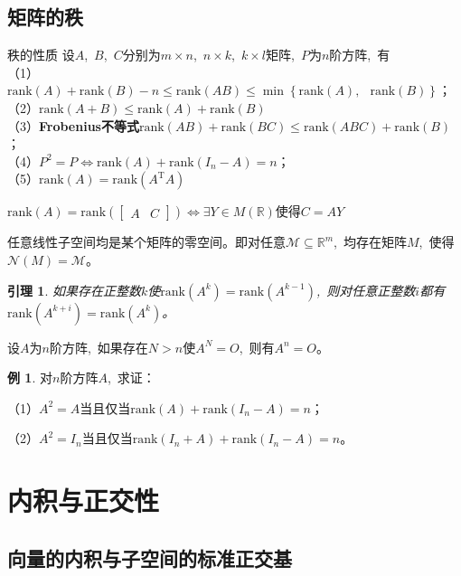 \documentclass[10pt, a4paper, oneside, fontset=none]{ctexart}
\theoremstyle{plain}
\newtheorem{lemma}[theorem]{引理}
\theoremstyle{definition}
\newtheorem{example}[theorem]{例}
\newcommand{\com}{,\,\,\,\:}
\newcommand{\di}[2][]{\begin{theo}{#1}\run #2\end{theo}}
\newcommand{\R}{\mathbb{R}}
\newcommand{\tbome}[1]{\textbf{\run\color{meihong!75!black}#1}}
\begin{document}
\subsection{矩阵的秩}
\di[秩的性质]{
    设$A$\com $B$\com $C$分别为$m\times n$\com $n\times k$\com $k\times l$矩阵\com $P$为$n$阶方阵\com 有\\
    （1）$\mathrm{rank}(A)+\mathrm{rank}(B)-n \le \mathrm{rank}(AB) \le \min\left\{\mathrm{rank}(A)\com \mathrm{rank}(B)\right\}$；\\
    （2）$\mathrm{rank}(A+B)\le \mathrm{rank}(A)+\mathrm{rank}(B)$\\
    （3）\tbome{\textup{Frobenius}不等式}\quad$\mathrm{rank}(AB)+\mathrm{rank}(BC) \le \mathrm{rank}(ABC)+\mathrm{rank}(B)$；\\
    （4）$P^2=P \Leftrightarrow \mathrm{rank}(A)+\mathrm{rank}(I_n-A)=n$；\\
    （5）$\mathrm{rank}(A)=\mathrm{rank}(A^\mathrm{T}A)$
}
\di[]{
    $\mathrm{rank}(A)=\mathrm{rank}\left(\begin{bmatrix}
        A & C
    \end{bmatrix}\right) \Leftrightarrow \exists Y\in M(\R) $使得$ C=AY$
}
\di[]{
    任意线性子空间均是某个矩阵的零空间。即对任意$\mathcal{M}\subseteq\R^m$\com 均存在矩阵$M$\com 使得$\mathcal{N}(M)=\mathcal{M}$。
}
\begin{lemma}
    如果存在正整数$k$使$\mathrm{rank}(A^k)=\mathrm{rank}(A^{k-1})$\com 则对任意正整数$i$都有$\mathrm{rank}(A^{k+i})=\mathrm{rank}(A^k)$。
\end{lemma}
\di[]{
    设$A$为$n$阶方阵\com 如果存在$N>n$使$A^N=O$\com 则有$A^n=O$。
}
\begin{example}
    对$n$阶方阵$A$\com 求证：

    （1）$A^2=A$当且仅当$\mathrm{rank}(A)+\mathrm{rank}(I_n-A)=n$；

    （2）$A^2=I_n$当且仅当$\mathrm{rank}(I_n+A)+\mathrm{rank}(I_n-A)=n$。
\end{example}
\newpage
\section{内积与正交性}
\subsection{向量的内积与子空间的标准正交基}
\end{document}
